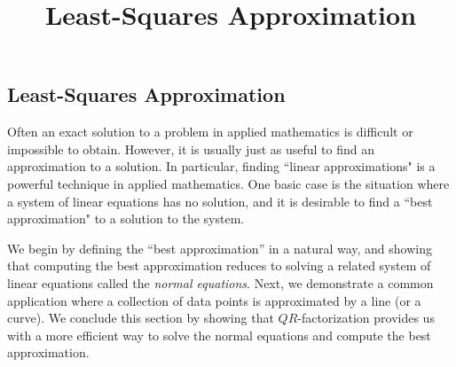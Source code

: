\documentclass{ximera}
\title{Least-Squares Approximation} \license{CC BY-NC-SA 4.0}
\begin{document}
\begin{abstract}
\end{abstract}
\maketitle

\begin{onlineOnly}
\section*{Least-Squares Approximation}
\end{onlineOnly}

 

Often an exact solution to a problem in applied mathematics is difficult or impossible to obtain. However, it is usually just as useful to find an approximation to a solution. In particular, finding ``linear approximations" is a powerful technique in applied mathematics. One basic case is the situation where a system
of linear equations has no solution, and it is desirable to find a ``best approximation" to a solution to the
system. 

We begin by defining the ``best approximation'' in a natural way, and showing that computing the best approximation reduces to solving a related system of linear equations  called the \emph{normal equations}.  Next, we demonstrate a common application where a collection of data points is approximated by a line (or a curve).  We conclude this section by showing that $QR$-factorization provides us with a more efficient way to solve the normal equations and compute the best approximation. 
\end{document}
